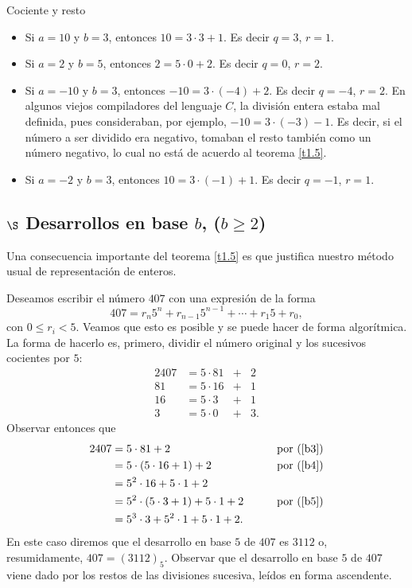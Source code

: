 \begin{section}{Cociente y resto}
\begin{ejemplo*} {} 

\begin{itemize}
\item Si $a=10$ y $b=3$, entonces $10 = 3 \cdot 3 +1$. Es decir $q= 3$, $r=1$. 
\item Si $a=2$ y $b=5$, entonces $2 = 5 \cdot 0 +2$. Es decir $q= 0$, $r=2$. 
\item Si $a=-10$ y $b=3$, entonces $-10 = 3 \cdot (-4) +2$. Es decir $q= -4$, $r=2$. En algunos viejos compiladores del lenguaje $C$, la división entera estaba mal definida, pues consideraban, por ejemplo, $-10 = 3 \cdot (-3) -1$. Es decir, si el número a ser dividido era negativo, tomaban el resto también como un número negativo, lo cual no está de acuerdo al teorema \ref{t1.5}.  
\item Si $a=-2$ y $b=3$, entonces $10 = 3 \cdot (-1) +1$. Es decir $q= -1$, $r=1$. 
\end{itemize}
\end{ejemplo*}

\subsection*{$\S$ Desarrollos en base $b$, ($b \ge 2$)}
    
    
Una consecuencia importante del teorema \ref{t1.5} es que
justifica nuestro método usual de representación de enteros. 

\begin{ejemplo*} Deseamos escribir el número $407$ con una expresión de la forma 
$$
407 = r_n5^n +r_{n-1} 5^{n-1}+\cdots + r_1 5 + r_0,
$$
con $0 \le r_i < 5$. Veamos que esto es posible y se puede hacer de forma algorítmica. La forma de hacerlo  es, primero, dividir el número original y los sucesivos cocientes por $5$:  
\begin{alignat}2
407 &=5\cdot 81 &+& 2 \label{b3}\\
81 & = 5\cdot 16 &+& 1  \label{b4}\\
16 & = 5\cdot 3 &+& 1  \label{b5}\\
3 & = 5\cdot 0 &+& 3.
\end{alignat}
Observar entonces que
\begin{alignat*}2
407 &=5\cdot 81 + 2  &\qquad& \text{por (\ref{b3})}\\
 &= 5\cdot (5\cdot 16 + 1) + 2  &\qquad& \text{por (\ref{b4})}\\
 &= 5^2 \cdot 16+ 5\cdot 1 + 2 &\qquad& \text{}\\
 &= 5^2 \cdot (5\cdot 3 + 1)+ 5\cdot 1 + 2   &\qquad& \text{por (\ref{b5})}\\
 &= 5^3 \cdot 3+ 5^2 \cdot 1 + 5\cdot 1 + 2.  &\qquad& \text{}
\end{alignat*}
En este caso diremos que el desarrollo en base $5$ de $407$ es $3112$ o, resumidamente, $407 = (3112)_5$.  Observar que el desarrollo en base $5$ de $407$ viene dado por los restos de las divisiones sucesiva, leídos en forma ascendente.
\end{ejemplo*}



\end{section}
